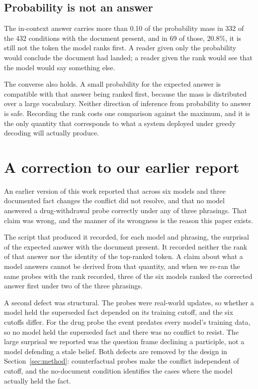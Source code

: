 \documentclass[10pt,conference]{IEEEtran}
\begin{document}
\subsection{Probability is not an answer}
\label{sec:rank}
The in-context answer carries more than 0.10 of the probability mass in 332 of the 432 conditions with the document present, and in 69 of those, 20.8\%, it is still not the token the model ranks first. A reader given only the probability would conclude the document had landed; a reader given the rank would see that the model would say something else.

The converse also holds. A small probability for the expected answer is compatible with that answer being ranked first, because the mass is distributed over a large vocabulary. Neither direction of inference from probability to answer is safe. Recording the rank costs one comparison against the maximum, and it is the only quantity that corresponds to what a system deployed under greedy decoding will actually produce.

\section{A correction to our earlier report}
\label{sec:correction}
An earlier version of this work reported that across six models and three documented fact changes the conflict did not resolve, and that no model answered a drug-withdrawal probe correctly under any of three phrasings. That claim was wrong, and the manner of its wrongness is the reason this paper exists.

The script that produced it recorded, for each model and phrasing, the surprisal of the expected answer with the document present. It recorded neither the rank of that answer nor the identity of the top-ranked token. A claim about what a model answers cannot be derived from that quantity, and when we re-ran the same probes with the rank recorded, three of the six models ranked the corrected answer first under two of the three phrasings.

A second defect was structural. The probes were real-world updates, so whether a model held the superseded fact depended on its training cutoff, and the six cutoffs differ. For the drug probe the event predates every model's training data, so no model held the superseded fact and there was no conflict to resist. The large surprisal we reported was the question frame declining a participle, not a model defending a stale belief. Both defects are removed by the design in Section~\ref{sec:method}: counterfactual probes make the conflict independent of cutoff, and the no-document condition identifies the cases where the model actually held the fact.
\end{document}
